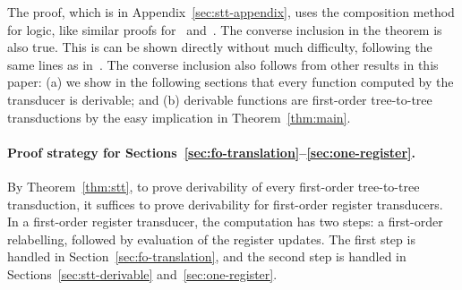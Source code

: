 The proof, which is in Appendix~\ref{sec:stt-appendix}, uses the composition method for logic,  like similar proofs for~\cite[Theorem 4.6]{alur2017streaming} and~\cite[Theorem 14]{bloem_comparison_2000}. 
The converse  inclusion in the  theorem is also true. This is can be shown directly without much difficulty, following the same lines as in~\cite[Section 5]{bloem_comparison_2000}. The converse inclusion also follows from   other results in this paper: (a) we show in the following sections that every function computed by the transducer is derivable; and (b)  derivable functions are first-order tree-to-tree transductions by the easy implication in Theorem~\ref{thm:main}.

\paragraph*{Proof strategy for Sections~\ref{sec:fo-translation}--\ref{sec:one-register}.} By Theorem~\ref{thm:stt}, to prove derivability of  every first-order tree-to-tree transduction, it suffices to prove derivability for first-order register transducers. In a first-order register transducer,  the computation  has two steps: a first-order relabelling, followed by evaluation of the register updates. The first step is handled in Section~\ref{sec:fo-translation}, and the second step is handled in Sections~\ref{sec:stt-derivable} and~\ref{sec:one-register}.






